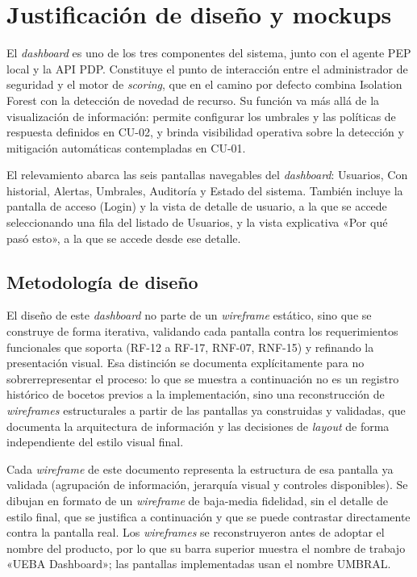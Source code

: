 \chapter{Justificación de diseño y mockups}\label{chap:diseno}
El \emph{dashboard} es uno de los tres componentes del sistema, junto con el agente PEP local y la API PDP. Constituye el punto de interacción entre el administrador de seguridad y el motor de \emph{scoring}, que en el camino por defecto combina Isolation Forest con la detección de novedad de recurso. Su función va más allá de la visualización de información: permite configurar los umbrales y las políticas de respuesta definidos en CU-02, y brinda visibilidad operativa sobre la detección y mitigación automáticas contempladas en CU-01.

El relevamiento abarca las seis pantallas navegables del \emph{dashboard}: Usuarios, Con historial, Alertas, Umbrales, Auditoría y Estado del sistema. También incluye la pantalla de acceso (Login) y la vista de detalle de usuario, a la que se accede seleccionando una fila del listado de Usuarios, y la vista explicativa «Por qué pasó esto», a la que se accede desde ese detalle.

\section{Metodología de diseño}
El diseño de este \emph{dashboard} no parte de un \emph{wireframe} estático, sino que se construye de forma iterativa, validando cada pantalla contra los requerimientos funcionales que soporta (RF-12 a RF-17, RNF-07, RNF-15) y refinando la presentación visual. Esa distinción se documenta explícitamente para no sobrerrepresentar el proceso: lo que se muestra a continuación no es un registro histórico de bocetos previos a la implementación, sino una reconstrucción de \emph{wireframes} estructurales a partir de las pantallas ya construidas y validadas, que documenta la arquitectura de información y las decisiones de \emph{layout} de forma independiente del estilo visual final.

Cada \emph{wireframe} de este documento representa la estructura de esa pantalla ya validada (agrupación de información, jerarquía visual y controles disponibles). Se dibujan en formato de un \emph{wireframe} de baja-media fidelidad, sin el detalle de estilo final, que se justifica a continuación y que se puede contrastar directamente contra la pantalla real. Los \emph{wireframes} se reconstruyeron antes de adoptar el nombre del producto, por lo que su barra superior muestra el nombre de trabajo «UEBA Dashboard»; las pantallas implementadas usan el nombre UMBRAL.

